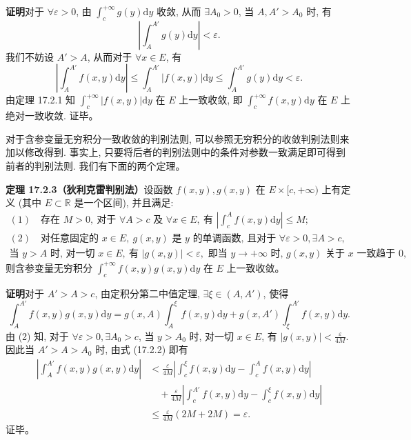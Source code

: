 \documentclass[UTF8,12pt,a4paper,fontset=fandol]{ctexart}
\begin{document}
\noindent\textbf{证明}\quad 对于 $\forall\varepsilon>0$, 由 $\int_c^{+\infty}g(y)\mathrm dy$ 收敛, 从而 $\exists A_0>0$, 当 $A,A'>A_0$ 时, 有
\[
  \left|\int_A^{A'}g(y)\mathrm dy\right|<\varepsilon.
\]
我们不妨设 $A'>A$, 从而对于 $\forall x\in E$, 有
\[
  \left|\int_A^{A'}f(x,y)\mathrm dy\right|
  \leqslant\int_A^{A'}|f(x,y)|\mathrm dy
  \leqslant\int_A^{A'}g(y)\mathrm dy<\varepsilon.
\]
由定理 17.2.1 知 $\int_c^{+\infty}|f(x,y)|\mathrm dy$ 在 $E$ 上一致收敛, 即 $\int_c^{+\infty}f(x,y)\mathrm dy$ 在 $E$ 上绝对一致收敛. 证毕。

对于含参变量无穷积分一致收敛的判别法则, 可以参照无穷积分的收敛判别法则来加以修改得到. 事实上, 只要将后者的判别法则中的条件对参数一致满足即可得到前者的判别法则. 我们有下面的两个定理。

\noindent\textbf{定理 17.2.3（狄利克雷判别法）}\quad 设函数 $f(x,y),g(x,y)$ 在 $E\times[c,+\infty)$ 上有定义 (其中 $E\subset\mathbb R$ 是一个区间), 并且满足:
\[
\begin{gathered}
  (1)\quad \text{存在 } M>0,\ \text{对于 } \forall A>c \text{ 及 } \forall x\in E,\ \text{有 }
  \left|\int_c^A f(x,y)\mathrm dy\right|\leqslant M;\\
  (2)\quad \text{对任意固定的 } x\in E,\ g(x,y) \text{ 是 } y \text{ 的单调函数, 且对于 } \forall\varepsilon>0,\exists A>c,\\
  \text{当 } y>A \text{ 时, 对一切 } x\in E,\ \text{有 } |g(x,y)|<\varepsilon,
  \text{ 即当 } y\to+\infty \text{ 时, } g(x,y) \text{ 关于 } x \text{ 一致趋于 } 0,
\end{gathered}
\]
则含参变量无穷积分 $\int_c^{+\infty}f(x,y)g(x,y)\mathrm dy$ 在 $E$ 上一致收敛。

\noindent\textbf{证明}\quad 对于 $A'>A>c$, 由定积分第二中值定理, $\exists\xi\in(A,A')$, 使得
\[
  \int_A^{A'}f(x,y)g(x,y)\mathrm dy
  =
  g(x,A)\int_A^\xi f(x,y)\mathrm dy
  +g(x,A')\int_\xi^{A'}f(x,y)\mathrm dy.
  \tag{17.2.2}
\]
由 (2) 知, 对于 $\forall\varepsilon>0,\exists A_0>c$, 当 $y>A_0$ 时, 对一切 $x\in E$, 有 $|g(x,y)|<\frac{\varepsilon}{4M}$. 因此当 $A'>A>A_0$ 时, 由式 (17.2.2) 即有
\[
\begin{aligned}
  \left|\int_A^{A'}f(x,y)g(x,y)\mathrm dy\right|
  &<\frac{\varepsilon}{4M}\left|\int_c^\xi f(x,y)\mathrm dy-\int_c^A f(x,y)\mathrm dy\right|\\
  &\quad+\frac{\varepsilon}{4M}\left|\int_c^{A'}f(x,y)\mathrm dy-\int_c^\xi f(x,y)\mathrm dy\right|\\
  &\leqslant\frac{\varepsilon}{4M}(2M+2M)=\varepsilon.
\end{aligned}
\]
证毕。
\end{document}
